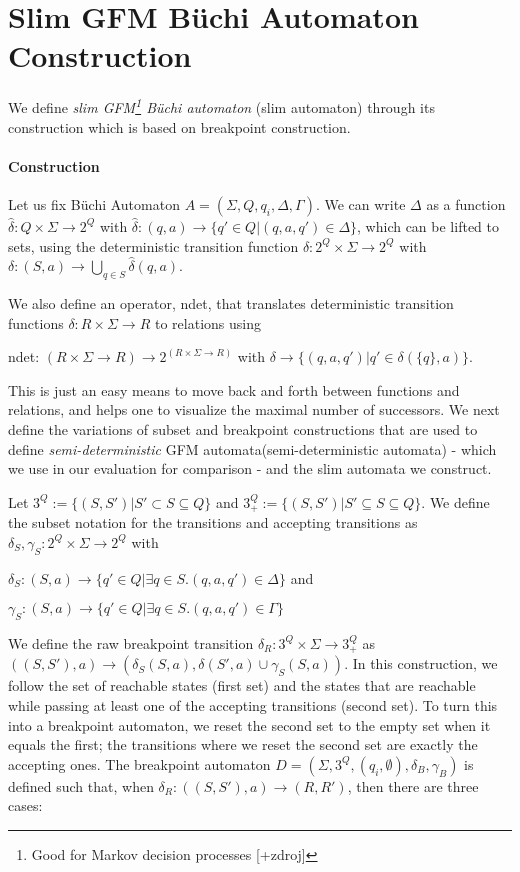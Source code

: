 \documentclass[
	digital
nolof, nolot
]{fithesis3}
\begin{document}
		\section{Slim GFM Büchi Automaton Construction}
			We define \emph{slim GFM\footnote{Good for Markov decision processes [+zdroj]} Büchi automaton} (slim automaton) through its construction which is based on breakpoint construction. 
			\paragraph{Construction}
			Let us fix Büchi Automaton $A=(\Sigma, Q, q_i, \Delta, \Gamma)$. We can write $\Delta$ as a function $\hat{\delta}: Q \times \Sigma \rightarrow 2^Q$ with
			$\hat{\delta}: (q, a) \rightarrow \{q' \in Q | (q, a, q') \in \Delta\}$,
			which can be lifted to sets, using the deterministic transition function $\delta: 2^Q \times \Sigma \rightarrow 2^Q$ with
			$\delta: (S, a) \rightarrow
			\bigcup_{q\in S} \hat{\delta}(q,a)$.
			
			We also define an operator, ndet, that translates deterministic transition functions
			$\delta: R \times \Sigma \rightarrow R$ to relations using
			
			ndet: $(R \times \Sigma \rightarrow R) \rightarrow 2^{(R \times \Sigma \rightarrow R)}$
			with
			$\delta \rightarrow \{(q,a,q')|q' \in \delta(\{q\},a)\}$.
			
			This is just an easy means to move back and forth between functions and relations,
			and helps one to visualize the maximal number of successors. We next define the variations of subset and breakpoint constructions that are used to define  \emph{semi-deterministic} GFM automata(semi-deterministic automata) - which we use in our evaluation for comparison - and the slim automata we construct.
			
			Let $3^Q :=\{(S,S')|S'\subset S \subseteq Q\}$ and
			$3^Q_+:=\{(S,S')|S'\subseteq S \subseteq Q\}$.
			We define the subset notation for the transitions and accepting transitions as $\delta_S,\gamma_S:2^Q \times \Sigma \rightarrow 2^Q$ with
			
			$\delta_S: (S,a)\rightarrow\{q'\in Q | \exists q \in S.(q,a,q') \in \Delta\}$ and
			
			$\gamma_S: (S,a)\rightarrow\{q'\in Q | \exists q \in S.(q,a,q') \in \Gamma\}$
			
			We define the raw breakpoint transition
			$\delta_R:3^Q \times \Sigma \rightarrow 3^Q_+$ as
			$((S, S'), a) \rightarrow(\delta_S(S, a), \delta(S',a)\cup \gamma_S(S, a))$.
			In this construction, we follow the set of reachable states (first set) and the states that are reachable while passing at least one of the accepting transitions (second set). To turn this into a breakpoint automaton, we reset the second set to the empty set when it equals the first; the transitions where we reset the second set are exactly the accepting ones. The breakpoint automaton $D = (\Sigma, 3^Q, (q_i, \emptyset), \delta_B, \gamma_B)$ is defined such that, when $\delta_R: ((S, S'), a) \rightarrow (R, R')$, then there are three cases:
			
\end{document}
